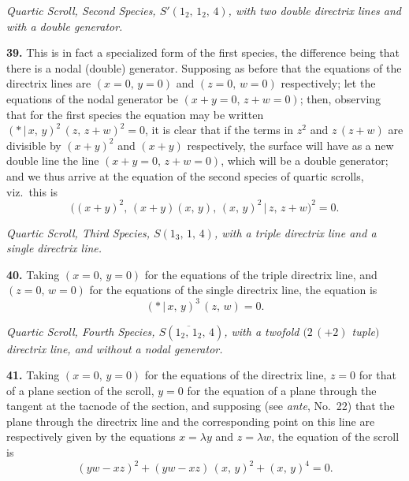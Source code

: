 \documentclass[11pt,a4paper]{article}
\providecommand{\mid}{\,|\,}
\begin{document}
\bigskip

\begin{center}
\textit{Quartic Scroll, Second Species, $S'(1_{2},\,1_{2},\,4)$, with two double directrix lines and with a double generator.}
\end{center}

\textbf{39.} This is in fact a specialized form of the first species, the difference being that there is a nodal (double) generator. Supposing as before that the equations of the directrix lines are $(x = 0,\,y = 0)$ and $(z = 0,\,w = 0)$ respectively; let the equations of the nodal generator be $(x + y = 0,\,z + w = 0)$; then, observing that for the first species the equation may be written $(*\mid x,\,y)^{2}\,(z,\,z + w)^{2} = 0$, it is clear that if the terms in $z^{2}$ and $z\,(z + w)$ are divisible by $(x + y)^{2}$ and $(x + y)$ respectively, the surface will have as a new double line the line $(x + y = 0,\,z + w = 0)$, which will be a double generator; and we thus arrive at the equation of the second species of quartic scrolls, viz.\ this is
\[
\bigl((x + y)^{2},\,(x + y)(x,\,y),\,(x,\,y)^{2}\mid z,\,z + w\bigr)^{2} = 0.
\]

\bigskip

\begin{center}
\textit{Quartic Scroll, Third Species, $S(1_{3},\,1,\,4)$, with a triple directrix line and a single directrix line.}
\end{center}

\textbf{40.} Taking $(x = 0,\,y = 0)$ for the equations of the triple directrix line, and $(z = 0,\,w = 0)$ for the equations of the single directrix line, the equation is
\[
(*\mid x,\,y)^{3}\,(z,\,w) = 0.
\]

\bigskip

\begin{center}
\textit{Quartic Scroll, Fourth Species, $S(\overline{1_{2},\,1_{2}},\,4)$, with a twofold $(2\,(+2)$ tuple$)$ directrix line, and without a nodal generator.}
\end{center}

\textbf{41.} Taking $(x = 0,\,y = 0)$ for the equations of the directrix line, $z = 0$ for that of a plane section of the scroll, $y = 0$ for the equation of a plane through the tangent at the tacnode of the section, and supposing (see \textit{ante}, No.~22) that the plane through the directrix line and the corresponding point on this line are respectively given by the equations $x = \lambda y$ and $z = \lambda w$, the equation of the scroll is
\[
(yw - xz)^{2} + (yw - xz)\,(x,\,y)^{2} + (x,\,y)^{4} = 0.
\]
\end{document}
